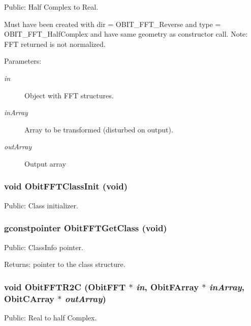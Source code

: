 Public: Half Complex to Real. 

Must have been created with dir = OBIT\_\-FFT\_\-Reverse and type = OBIT\_\-FFT\_\-Half\-Complex and have same geometry as constructor call. Note: FFT returned is not normalized. \begin{Desc}
\item[Parameters:]
\begin{description}
\item[{\em in}]Object with FFT structures. \item[{\em in\-Array}]Array to be transformed (disturbed on output). \item[{\em out\-Array}]Output array \end{description}
\end{Desc}
\subsubsection{\setlength{\rightskip}{0pt plus 5cm}void Obit\-FFTClass\-Init (void)}\label{ObitFFT_8h_a11}


Public: Class initializer. 

\subsubsection{\setlength{\rightskip}{0pt plus 5cm}gconstpointer Obit\-FFTGet\-Class (void)}\label{ObitFFT_8h_a13}


Public: Class\-Info pointer. 

\begin{Desc}
\item[Returns:]pointer to the class structure. \end{Desc}
\subsubsection{\setlength{\rightskip}{0pt plus 5cm}void Obit\-FFTR2C ({\bf Obit\-FFT} $\ast$ {\em in}, {\bf Obit\-FArray} $\ast$ {\em in\-Array}, {\bf Obit\-CArray} $\ast$ {\em out\-Array})}\label{ObitFFT_8h_a15}


Public: Real to half Complex. 


